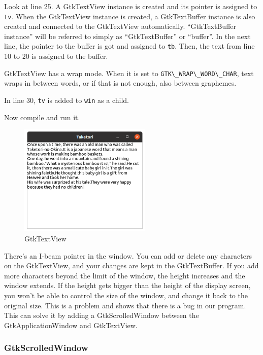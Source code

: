 Look at line 25. A GtkTextView instance is created and its pointer is
assigned to \passthrough{\lstinline!tv!}. When the GtkTextView instance
is created, a GtkTextBuffer instance is also created and connected to
the GtkTextView automatically. ``GtkTextBuffer instance'' will be
referred to simply as ``GtkTextBuffer'' or ``buffer''. In the next line,
the pointer to the buffer is got and assigned to
\passthrough{\lstinline!tb!}. Then, the text from line 10 to 20 is
assigned to the buffer.

GtkTextView has a wrap mode. When it is set to
\passthrough{\lstinline!GTK\_WRAP\_WORD\_CHAR!}, text wraps in between
words, or if that is not enough, also between graphemes.

In line 30, \passthrough{\lstinline!tv!} is added to
\passthrough{\lstinline!win!} as a child.

Now compile and run it.

\begin{figure}
\centering
\includegraphics[width=6.3cm,height=5.325cm]{../image/screenshot_tfv1.png}
\caption{GtkTextView}
\end{figure}

There's an I-beam pointer in the window. You can add or delete any
characters on the GtkTextView, and your changes are kept in the
GtkTextBuffer. If you add more characters beyond the limit of the
window, the height increases and the window extends. If the height gets
bigger than the height of the display screen, you won't be able to
control the size of the window, and change it back to the original size.
This is a problem and shows that there is a bug in our program. This can
solve it by adding a GtkScrolledWindow between the GtkApplicationWindow
and GtkTextView.

\hypertarget{gtkscrolledwindow}{%
\subsubsection{GtkScrolledWindow}\label{gtkscrolledwindow}}

